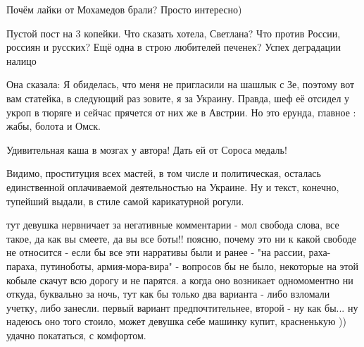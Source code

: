 \begin{itemize}
Почём лайки от Мохамедов брали?
Просто интересно)

 

Пустой пост на 3 копейки. Что сказать хотела, Светлана? Что против России,
россиян и русских? Ещё одна в строю любителей печенек? Успех деградации налицо

\begin{itemize}
 
Она сказала: Я обиделась, что меня не пригласили на шашлык с Зе, поэтому вот вам статейка, в следующий раз зовите, я за Украину.
Правда, шеф её отсидел у укроп в тюряге и сейчас прячется от них же в Австрии.
Но это ерунда, главное : жабы, болота и Омск.
\end{itemize}

 
Удивительная каша в мозгах у автора! Дать ей от Сороса медаль!

 

Видимо, проституция всех мастей, в том числе и политическая, осталась
единственной оплачиваемой деятельностью на Украине. Ну и текст, конечно,
тупейший выдали, в стиле самой карикатурной рогули.


 

тут девушка нервничает за негативные комментарии - мол свобода слова, все
такое, да как вы смеете, да вы все боты!! поясню, почему это ни к какой свободе
не относится - если бы все эти нарративы были и ранее - "на рассии,
раха-параха, путиноботы, армия-мора-вира" - вопросов бы не было, некоторые на
этой кобыле скачут всю дорогу и не парятся. а когда оно возникает одномоментно
ни откуда, буквально за ночь, тут как бы только два варианта - либо взломали
учетку, либо занесли. первый вариант предпочтительнее, второй - ну как бы... ну
надеюсь оно того стоило, может девушка себе машинку купит, красненькую ))
удачно покататься, с комфортом.


\end{itemize}
